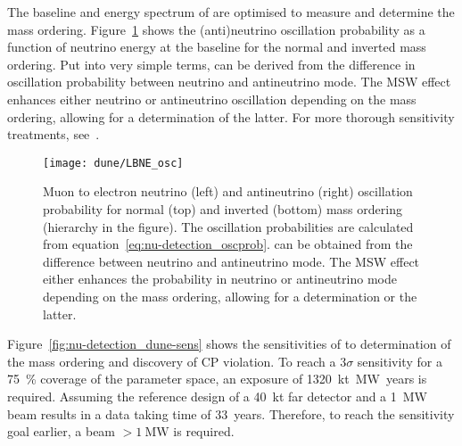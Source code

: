 The baseline and energy spectrum of \dune{} are optimised to measure \dcp{} and determine the mass ordering.
Figure~\ref{fig:nu-detection_dune-osc} shows the (anti)neutrino oscillation probability as a function of neutrino energy at the \dune{} baseline for the normal and inverted mass ordering.
Put into very simple terms, \dcp{} can be derived from the difference in oscillation probability between neutrino and antineutrino mode.
The MSW effect enhances either neutrino or antineutrino oscillation depending on the mass ordering, allowing for a determination of the latter.
For more thorough sensitivity treatments, see~\cite{king, duneT2HKSens, qianVogel}.

\begin{figure}[htb]
	\centering
	\texttt{[image: dune/LBNE\_osc]}
	\caption{Muon to electron neutrino (left) and antineutrino (right) oscillation probability for normal (top) and inverted (bottom) mass ordering (hierarchy in the figure).
	The oscillation probabilities are calculated from equation~\eqref{eq:nu-detection_oscprob}.
	\dcp{} can be obtained from the difference between neutrino and antineutrino mode.
	The MSW effect either enhances the probability in neutrino or antineutrino mode depending on the mass ordering, allowing for a determination or the latter.~\cite{qianVogel}}
	\label{fig:nu-detection_dune-osc}
\end{figure}

Figure~\ref{fig:nu-detection_dune-sens} shows the sensitivities of \dune{} to determination of the mass ordering and discovery of CP violation.
To reach a $3 \sigma$ sensitivity for a \SI{75}{\percent} coverage of the \dcp{} parameter space, an exposure of \SI{1320}{\kilo\tonne\mega\watt.years} is required.
Assuming the reference design of a \SI{40}{\kilo\tonne} far detector and a \SI{1}{\mega\watt} beam results in a data taking time of \SI{33}{years}.
Therefore, to reach the sensitivity goal earlier, a beam $> \SI{1}{\mega\watt}$ is required.

